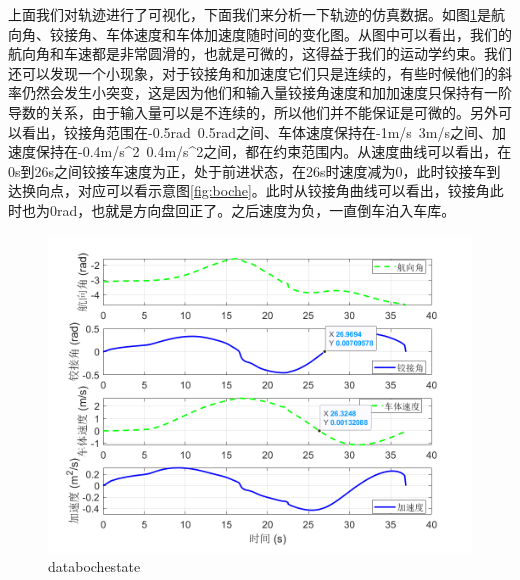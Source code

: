 \documentclass[master,academic]{ysuthesis} %
\begin{document}
		上面我们对轨迹进行了可视化，下面我们来分析一下轨迹的仿真数据。如图\ref{fig:databochestate}是航向角、铰接角、车体速度和车体加速度随时间的变化图。从图中可以看出，我们的航向角和车速都是非常圆滑的，也就是可微的，这得益于我们的运动学约束。我们还可以发现一个小现象，对于铰接角和加速度它们只是连续的，有些时候他们的斜率仍然会发生小突变，这是因为他们和输入量铰接角速度和加加速度只保持有一阶导数的关系，由于输入量可以是不连续的，所以他们并不能保证是可微的。另外可以看出，铰接角范围在-0.5rad~0.5rad之间、车体速度保持在-1m/s~3m/s之间、加速度保持在-0.4m/s^2~0.4m/s^2之间，都在约束范围内。从速度曲线可以看出，在0s到26s之间铰接车速度为正，处于前进状态，在26s时速度减为0，此时铰接车到达换向点，对应可以看示意图\ref{fig:boche}。此时从铰接角曲线可以看出，铰接角此时也为0rad，也就是方向盘回正了。之后速度为负，一直倒车泊入车库。
		\begin{figure}[!ht]
			\centering
			\includegraphics[width=1\textwidth]{databochestate.png}
			\caption{databochestate}
			\label{fig:databochestate}
		\end{figure}
\end{document}
